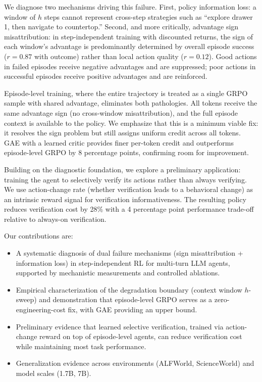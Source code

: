 \documentclass[11pt]{article}
\begin{document}
We diagnose two mechanisms driving this failure. First, policy information loss: a window of $h$ steps cannot represent cross-step strategies such as ``explore drawer 1, then navigate to countertop.'' Second, and more critically, advantage sign misattribution: in step-independent training with discounted returns, the sign of each window's advantage is predominantly determined by overall episode success ($r=0.87$ with outcome) rather than local action quality ($r=0.12$). Good actions in failed episodes receive negative advantages and are suppressed; poor actions in successful episodes receive positive advantages and are reinforced.

Episode-level training, where the entire trajectory is treated as a single GRPO sample with shared advantage, eliminates both pathologies. All tokens receive the same advantage sign (no cross-window misattribution), and the full episode context is available to the policy. We emphasize that this is a minimum viable fix: it resolves the sign problem but still assigns uniform credit across all tokens. GAE with a learned critic provides finer per-token credit and outperforms episode-level GRPO by 8 percentage points, confirming room for improvement.

Building on the diagnostic foundation, we explore a preliminary application: training the agent to selectively verify its actions rather than always verifying. We use action-change rate (whether verification leads to a behavioral change) as an intrinsic reward signal for verification informativeness. The resulting policy reduces verification cost by 28\% with a 4 percentage point performance trade-off relative to always-on verification.

Our contributions are:
\begin{itemize}[nosep]
\item A systematic diagnosis of dual failure mechanisms (sign misattribution + information loss) in step-independent RL for multi-turn LLM agents, supported by mechanistic measurements and controlled ablations.
\item Empirical characterization of the degradation boundary (context window $h$-sweep) and demonstration that episode-level GRPO serves as a zero-engineering-cost fix, with GAE providing an upper bound.
\item Preliminary evidence that learned selective verification, trained via action-change reward on top of episode-level agents, can reduce verification cost while maintaining most task performance.
\item Generalization evidence across environments (ALFWorld, ScienceWorld) and model scales (1.7B, 7B).
\end{itemize}
\end{document}
